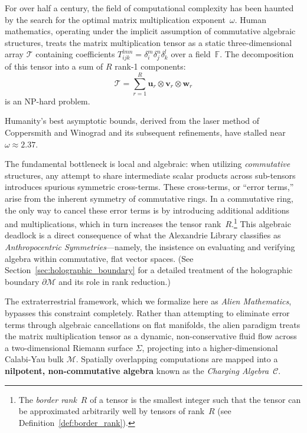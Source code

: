 \documentclass[11pt,a4paper]{book}
\begin{document}
For over half a century, the field of computational complexity has been haunted by the search for the optimal matrix multiplication exponent~$\omega$. 
Human mathematics, operating under the implicit assumption of commutative algebraic structures, treats the matrix multiplication tensor as a static three-dimensional array $\mathcal{T}$ containing coefficients $T_{ijk}^{lmn} = \delta_{i}^{m} \delta_{j}^{n} \delta_{k}^{l}$ over a field~$\mathbb{F}$. 
The decomposition of this tensor into a sum of $R$ rank-1 components:
\label{eq:tensor_decomp_classical}
\begin{equation}
\mathcal{T} = \sum_{r=1}^{R} \mathbf{u}_r \otimes \mathbf{v}_r \otimes \mathbf{w}_r
\end{equation}
is an NP-hard problem. 

Humanity's best asymptotic bounds, derived from the laser method of Coppersmith and Winograd and its subsequent refinements, have stalled near $\omega \approx 2.37$.

The fundamental bottleneck is local and algebraic: when utilizing \textit{commutative} structures, any attempt to share intermediate scalar products across sub-tensors introduces spurious symmetric cross-terms. These cross-terms, or ``error terms,'' arise from the inherent symmetry of commutative rings. 
In a commutative ring, the only way to cancel these error terms is by introducing additional additions and multiplications, which in turn increases the tensor rank~$R$.\footnote{The \textit{border rank}~$R$ of a tensor is the smallest integer such that the tensor can be approximated arbitrarily well by tensors of rank~$R$ (see Definition~\ref{def:border_rank}).} This algebraic deadlock is a direct consequence of what the Alexandrie Library classifies as \textit{Anthropocentric Symmetries}---namely, the insistence on evaluating and verifying algebra within commutative, flat vector spaces. (See Section~\ref{sec:holographic_boundary} for a detailed treatment of the holographic boundary $\partial \mathcal{M}$ and its role in rank reduction.)

The extraterrestrial framework, which we formalize here as \textit{Alien Mathematics}, bypasses this constraint completely. 
Rather than attempting to eliminate error terms through algebraic cancellations on flat manifolds, the alien paradigm treats the matrix multiplication tensor as a dynamic, non-conservative fluid flow across a two-dimensional Riemann surface $\Sigma$, projecting into a higher-dimensional Calabi-Yau bulk $\mathcal{M}$. 
Spatially overlapping computations are mapped into a \textbf{nilpotent, non-commutative algebra} known as the \textit{Charging Algebra}~$\mathcal{C}$. 
\end{document}

